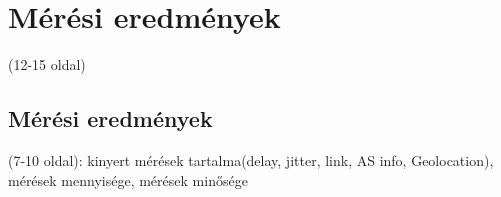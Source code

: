 \chapter{Mérési eredmények}
(12-15 oldal)



\section{Mérési eredmények}
(7-10 oldal): kinyert mérések tartalma(delay, jitter, link, AS info, Geolocation), mérések mennyisége, mérések minősége

